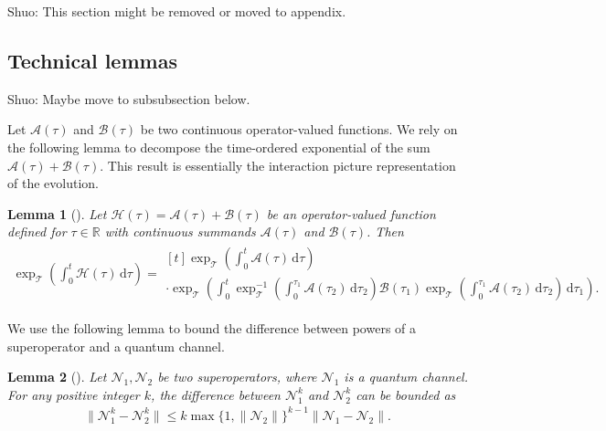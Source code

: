 \documentclass[11pt]{article}
\newtheorem{lemma}{Lemma}
\renewcommand{\d}{\mathrm{d}}
\newcommand{\mc}{\mathcal}
\newcommand{\sz}[1]{{\color{blue} Shuo: #1}}
\begin{document}
\sz{This section might be removed or moved to appendix.}
\subsection{Technical lemmas}
\sz{Maybe move to subsubsection below.}

Let $\mc A(\tau)$ and $\mc B(\tau)$ be two continuous operator-valued functions. We rely on the following lemma to decompose the time-ordered exponential of the sum $\mc A(\tau) + \mc B(\tau)$. This result is essentially the interaction picture representation of the evolution.
\begin{lemma}[{\cite[Page 21]{dollard1984product}}]
\label{lem:interaction-pic}
    Let $\mc H(\tau) = \mc A(\tau) + \mc B(\tau)$ be an operator-valued function defined for $\tau \in \mathbb{R}$ with continuous summands $\mc A(\tau)$ and $\mc B(\tau)$. Then
    \begin{align*}
    \exp_{\mc T}\left(\int_{0}^{t}  \mc H(\tau)\, \d \tau\right) =  \begin{multlined}[t]
        \exp_{\mc T}\left(\int_{0}^{t}  \mc A(\tau)\, \d \tau\right) \\
     \cdot \exp_{\mc T}\left(\int_{0}^{t}\exp_{\mc T}^{-1}\left(\int_{0}^{\tau_1}  \mc A(\tau_2)\, \d \tau_2\right)\mc  B(\tau_1) \exp_{\mc T}\left(\int_{0}^{\tau_1}\mc  A(\tau_2)\, \d \tau_2\right)\, \d \tau_1\right).
    \end{multlined}
    \end{align*}
\end{lemma} 
We use the following lemma to bound the difference between powers of a superoperator and a quantum channel. 
\begin{lemma}[{\cite[Lemma~3]{wang2026lindbladiansimulationcommutatorbounds}}]
\label{lem:power-bound}
    Let $\mc N_1, \mc N_2$ be two superoperators, where $\mc N_1$ is a quantum channel. For any positive integer $k$, the difference between $\mc N_1^k$ and $\mc N_2^{k}$ can be bounded as
    \begin{align*}
        \|\mc N_1^k-\mc N_2^k\| \le k \max\{1, \|\mc N_2\|\}^{k-1} \|\mc N_1-\mc N_2\|.
    \end{align*}
\end{lemma}
\end{document}
